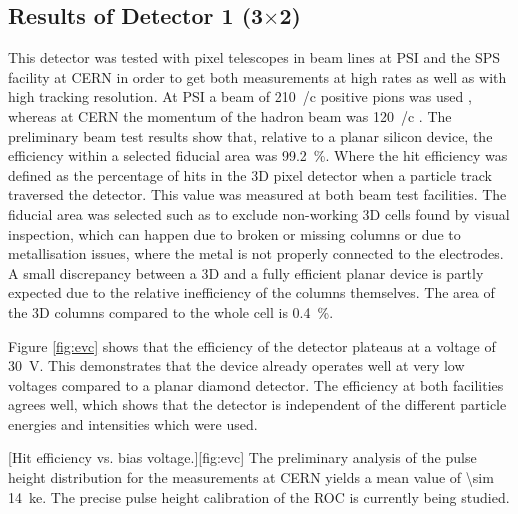 \subsection{Results of Detector 1 (3$\times$2)}
This detector was tested with pixel telescopes in beam lines at \ac{PSI} and the SPS facility at CERN in order to get both measurements at high rates as well as with high tracking resolution. At \ac{PSI} a beam of \SI{210}{\mev/c} positive pions was used \cite{pim1}, whereas at CERN the momentum of the hadron beam was \SI{120}{\gev/c} \cite{h6}. The preliminary beam test results show that, relative to a planar silicon device, the efficiency within a selected fiducial area was \SI{99.2}{\%}. Where the hit efficiency was defined as the percentage of hits in the 3D pixel detector when a particle track traversed the detector. This value was measured at both beam test facilities. The fiducial area was selected such as to exclude non-working 3D cells found by visual inspection, which can happen due to broken or missing columns or due to metallisation issues, where the metal is not properly connected to the electrodes. A small discrepancy between a 3D and a fully efficient planar device is partly expected due to the relative inefficiency of the columns themselves. The area of the 3D columns compared to the whole cell is \SI{.4}{\%}. \par 
Figure \vref{fig:evc} shows that the efficiency of the detector plateaus at a voltage of \SI{30}{\volt}. This demonstrates that the device already operates well at very low voltages compared to a planar diamond detector. The efficiency at both facilities agrees well, which shows that the detector is independent of the different particle energies and intensities which were used.\par 
{}[Hit efficiency vs. bias voltage.][fig:evc]
The preliminary analysis of the pulse height distribution for the measurements at CERN yields a mean value of \SI{\sim 14}{\kilo e}. The precise pulse height calibration of the \ac{ROC} is currently being studied.